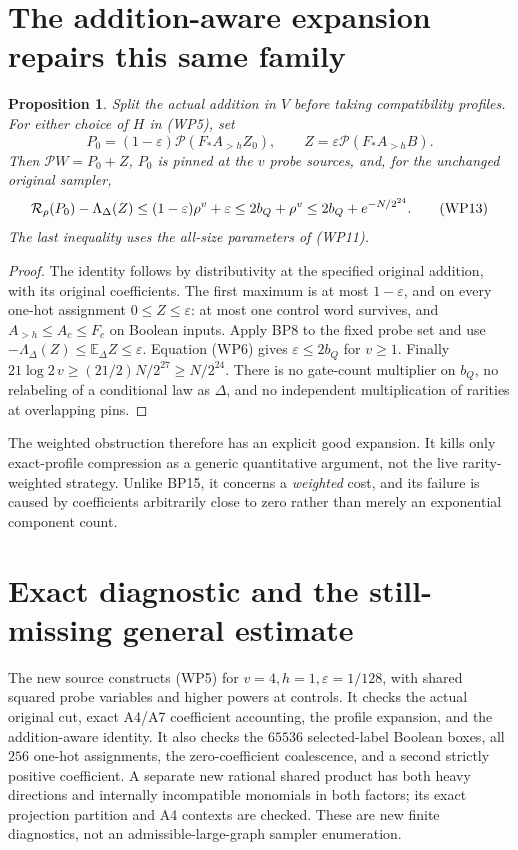 \documentclass[11pt]{article}
\newtheorem{proposition}{Proposition}
\newcommand{\Pp}{\mathcal P}
\begin{document}
\section{The addition-aware expansion repairs this same family}
\begin{proposition}
Split the actual addition in $V$ before taking compatibility profiles.
For either choice of $H$ in (WP5), set
\[
 P_0=(1-\varepsilon)\Pp(F_*A_{>h}Z_0),\qquad
 Z=\varepsilon\Pp(F_*A_{>h}B).                         \tag{WP12}
\]
Then $\Pp W=P_0+Z$, $P_0$ is pinned at the $v$ probe sources,
and, for the unchanged original sampler,
\[
 {\cal R}_\rho(P_0)-\Lambda_\Delta(Z)
 \le(1-\varepsilon)\rho^v+\varepsilon
 \le 2b_Q+\rho^v
 \le 2b_Q+e^{-N/2^{24}}.                               \tag{WP13}
\]
The last inequality uses the all-size parameters of (WP11).
\end{proposition}
\begin{proof}
The identity follows by distributivity at the specified original
addition, with its original coefficients.
The first maximum is at most $1-\varepsilon$, and on every one-hot
assignment $0\le Z\le\varepsilon$: at most one control word survives,
and $A_{>h}\le A_c\le F_c$ on Boolean inputs.
Apply BP8 to the fixed probe set and use
$-\Lambda_\Delta(Z)\le\mathbb E_\Delta Z\le\varepsilon$.
Equation (WP6) gives $\varepsilon\le2b_Q$ for $v\ge1$.
Finally $21\log2\,v\ge(21/2)N/2^{27}\ge N/2^{24}$.
There is no gate-count multiplier on $b_Q$, no relabeling of a
conditional law as $\Delta$, and no independent multiplication of
rarities at overlapping pins.
\end{proof}

The weighted obstruction therefore has an explicit good expansion.
It kills only exact-profile compression as a generic quantitative
argument, not the live rarity-weighted strategy.
Unlike BP15, it concerns a \emph{weighted} cost, and its failure is
caused by coefficients arbitrarily close to zero rather than merely
an exponential component count.

\section{Exact diagnostic and the still-missing general estimate}
The new source  constructs
(WP5) for $v=4,h=1,\varepsilon=1/128$, with shared squared probe
variables and higher powers at controls.
It checks the actual original cut, exact A4/A7 coefficient accounting,
the profile expansion, and the addition-aware identity.
It also checks the $65536$ selected-label Boolean boxes, all $256$
one-hot assignments, the zero-coefficient coalescence, and a second
strictly positive coefficient. A separate new rational shared product
has both heavy directions and internally incompatible monomials in
both factors; its exact projection partition and A4 contexts are checked.
These are new finite diagnostics,
not an admissible-large-graph sampler enumeration.
\end{document}
